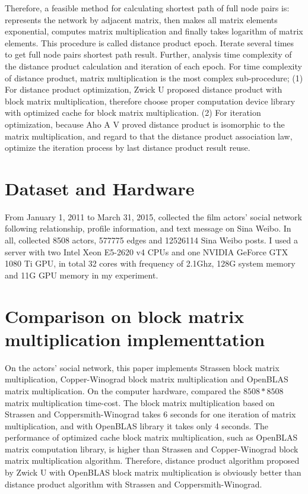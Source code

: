 \documentclass[review]{cvpr}
\begin{document}
Therefore, a feasible method for calculating shortest path of full node pairs is: represents the network by adjacent matrix, then makes all matrix elements exponential, computes matrix multiplication and finally takes logarithm of matrix elements.
This procedure is called distance product epoch. Iterate several times to get full node pairs shortest path result.
Further, analysis time complexity of the distance product calculation and iteration of each epoch. For time complexity of distance product, matrix multiplication is the most complex sub-procedure;
(1) For distance product optimization, Zwick U proposed distance product with block matrix multiplication, therefore choose proper computation device library with optimized cache for block matrix multiplication.
(2) For iteration optimization, because Aho A V proved distance product is isomorphic to the matrix multiplication, and regard to that the distance product association law, optimize the iteration process by last distance product result reuse.


\section{Dataset and Hardware}
From January 1, 2011 to March 31, 2015, collected the film actors' social network following relationship, profile information, and text message on Sina Weibo. In all, collected 8508 actors, 577775 edges and 12526114 Sina Weibo posts.
I used a server with two Intel Xeon E5-2620 v4 CPUs and one NVIDIA GeForce GTX 1080 Ti GPU, in total 32 cores with frequency of 2.1Ghz, 128G system memory and 11G GPU memory in my experiment.



\section{Comparison on block matrix multiplication implementtation}
On the actors' social network, this paper implements Strassen block matrix multiplication, Copper-Winograd block matrix multiplication and OpenBLAS matrix multiplication. On the computer hardware, compared the $8508*8508$ matrix multiplication time-cost.
The block matrix multiplication based on Strassen and Coppersmith-Winograd takes 6 seconds for one iteration of matrix multiplication, and with OpenBLAS library it takes only 4 seconds.
The performance of optimized cache block matrix multiplication, such as OpenBLAS matrix computation library, is higher than Strassen and Copper-Winograd block matrix multiplication algorithm.
Therefore, distance product algorithm proposed by Zwick U with OpenBLAS block matrix multiplication is obviously better than distance product algorithm with Strassen and Coppersmith-Winograd.
\end{document}
